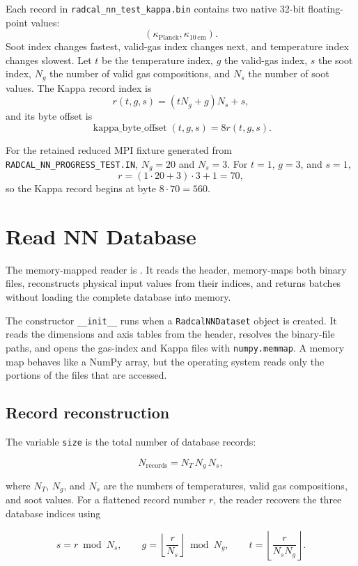 \documentclass[11pt]{article}
\begin{document}
Each record in \texttt{radcal\_nn\_test\_kappa.bin} contains two native
32-bit floating-point values:
\[
(\kappa_{\mathrm{Planck}},\kappa_{10\,\mathrm{cm}}).
\]
Soot index changes fastest, valid-gas index changes next, and temperature
index changes slowest. Let \(t\) be the temperature index, \(g\) the
valid-gas index, \(s\) the soot index, \(N_g\) the number of valid gas
compositions, and \(N_s\) the number of soot values. The Kappa record index is
\[
r(t,g,s)=\left(tN_g+g\right)N_s+s,
\]
and its byte offset is
\[
\operatorname{kappa\_byte\_offset}(t,g,s)=8r(t,g,s).
\]

For the retained reduced MPI fixture generated from
\texttt{RADCAL\_NN\_PROGRESS\_TEST.IN}, \(N_g=20\) and \(N_s=3\). For
\(t=1\), \(g=3\), and \(s=1\),
\[
r=(1\cdot20+3)\cdot3+1=70,
\]
so the Kappa record begins at byte \(8\cdot70=560\).

\section{Read NN Database}

The memory-mapped reader is
.
It reads the header,
memory-maps both binary files, reconstructs physical input values from their
indices, and returns batches without loading the complete database into
memory.

The constructor \texttt{\_\_init\_\_} runs when a
\texttt{RadcalNNDataset} object is created. It reads the dimensions and axis
tables from the header, resolves the binary-file paths, and opens the gas-index
and Kappa files with \texttt{numpy.memmap}. A memory map behaves like a NumPy
array, but the operating system reads only the portions of the files that are
accessed.

\subsection{Record reconstruction}

The variable \texttt{size} is the total number of database records:

\[
N_{\mathrm{records}}=N_T\,N_g\,N_s,
\]

where \(N_T\), \(N_g\), and \(N_s\) are the numbers of temperatures, valid gas
compositions, and soot values. For a flattened record number \(r\), the reader
recovers the three database indices using

\[
s=r\bmod N_s,\qquad
g=\left\lfloor\frac{r}{N_s}\right\rfloor\bmod N_g,\qquad
t=\left\lfloor\frac{r}{N_sN_g}\right\rfloor.
\]
\end{document}
